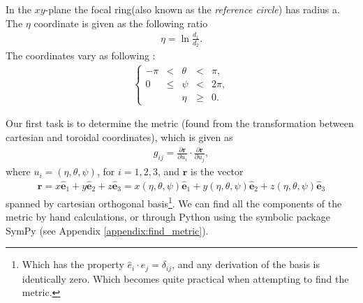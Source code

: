 \documentclass[main.tex]{subfiles}
\begin{document}
\hspace{-6mm}In the $xy$-plane the focal ring(also known as the 
\emph{reference circle}) has radius a. The $\eta$ coordinate is given as the following ratio
\begin{align*}
\eta = \ln \frac{d_1}{d_2}.
\end{align*} 
The coordinates vary as following :
\begin{align*}
\left\{\begin{matrix}
 -\pi& <& \theta &<& \pi,\\
 0 &\leq& \psi &<& 2\pi,\\
& \phantom{0} & \eta &\geq& 0.
\end{matrix}\right.
\end{align*}

Our first task is to determine the metric (found from the transformation between cartesian 
and toroidal coordinates), which is given as 
\begin{align*}
g_{ij} = \frac{\partial \mathbf{r}}{\partial u_i} \cdot \frac{\partial \mathbf{r}}{\partial u_j},
\end{align*}
where $u_i = (\eta, \theta , \psi)$, for $i=1,2,3$, and $\mathbf{r}$ is the vector
\begin{align*}
\mathbf{r} = x\hat{\mathbf{e}}_1 + y\hat{\mathbf{e}}_2 + z\hat{\mathbf{e}}_3 = 
x(\eta, \theta , \psi)\hat{\mathbf{e}}_1 + y(\eta, \theta , \psi)\hat{\mathbf{e}}_2 + 
z(\eta, \theta , \psi)\hat{\mathbf{e}}_3
\end{align*}
spanned by cartesian orthogonal basis\footnote{Which has the property 
$\hat{e}_i\cdot \hat{e}_j = \delta_{ij}$, and any derivation of the basis is identically zero.
Which becomes quite practical when attempting to find the metric.}. 
We can find all the components of the metric by hand calculations, or through Python using 
the symbolic package SymPy (see Appendix \ref{appendix:find_metric}). 
\end{document}
